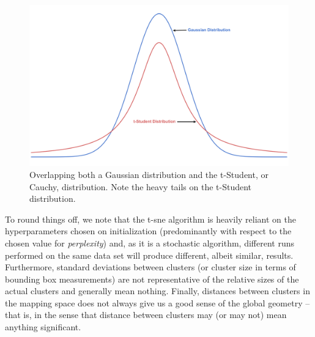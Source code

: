 \begin{figure}[H]
    \centering
    \includegraphics[width=\textwidth]{Images/Chapter 3/t-SNE/t-SNE-Illustration-1.png}
    \caption{Overlapping both a Gaussian distribution and the t-Student, or Cauchy, distribution. Note the heavy tails on the t-Student distribution.}
    \label{fig:t-SNE-Illustration}
\end{figure}

\noindent \newline To round things off, we note that the \gls{t-sne} algorithm is heavily reliant on the hyperparameters chosen on initialization (predominantly with respect to the chosen value for \textit{perplexity}) and, as it is a stochastic algorithm, different runs performed on the same data set will produce different, albeit similar, results. Furthermore, standard deviations between clusters (or cluster size in terms of bounding box measurements) are not representative of the relative sizes of the actual clusters and generally mean nothing. Finally, distances between clusters in the mapping space does not always give us a good sense of the global geometry -- that is, in the sense that distance between clusters may (or may not) mean anything significant.

